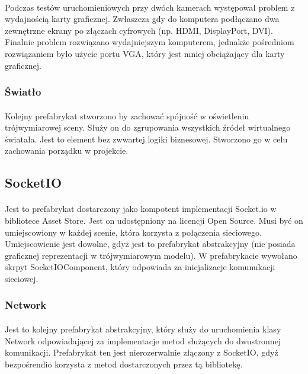 \paragraph{}
Podczas testów uruchomieniowych przy dwóch kamerach występował problem z wydajnością karty graficznej. Zwłaszcza gdy do komputera podłączano dwa zewnętrzne ekrany po złączach cyfrowych (np. HDMI, DisplayPort, DVI). Finalnie problem rozwiązano wydajniejszym komputerem, jednakże pośredniom rozwiązaniem było użycie portu VGA, który jest mniej obciążający dla karty graficznej.

\subsubsection{Światło}
\paragraph{}
Kolejny prefabrykat stworzono by zachować spójność w oświetleniu trójwymiarowej sceny. Służy on do zgrupowania wszystkich źródeł wirtualnego światała. Jest to element bez zwwartej logiki biznesowej. Stworzono go w celu zachowania porządku w projekcie.


\subsection{SocketIO}
\paragraph{}
Jest to prefabrykat dostarczony jako kompotent implementacji Socket.io w bibliotece Asset Store. Jest on udostępniony na licencji Open Source.  Musi być on umiejscowiony w każdej scenie, która korzysta z połączenia sieciowego. Umiejscowienie jest dowolne, gdyż jest to prefabrykat abstrakcyjny (nie posiada graficznej reprezentacji w trójwymiarowym modelu). W prefabrykacie wywołano skrpyt SocketIOComponent, który odpowiada za inicjalizacje komunukacji sieciowej.

\subsubsection{Network}
\paragraph{}
Jest to kolejny prefabrykat abstrakcyjny, który służy do uruchomienia klasy Network odpowiadającej za implementacje metod służących do dwustronnej komunikacji.
Prefabrykat ten jest nierozerwalnie złączony z SocketIO, gdyż bezpośrendio korzysta z metod dostarczonych przez tą bibliotekę.


